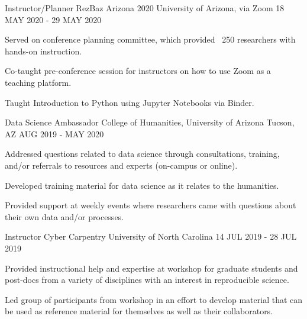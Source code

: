 \begin{cventries}
\cventry
{Instructor/Planner} %
{RezBaz Arizona 2020} %
{University of Arizona, via Zoom} %
{18 MAY 2020 - 29 MAY 2020} %
{ %
\begin{cvitems}
\item {Served on conference planning committee, which provided ~250 researchers with hands-on instruction.}
\item {Co-taught pre-conference session for instructors on how to use Zoom as a teaching platform.}
\item {Taught Introduction to Python using Jupyter Notebooks via Binder.}
\end{cvitems}
}


\cventry
{Data Science Ambassador} %
{College of Humanities, University of Arizona} %
{Tucson, AZ} %
{AUG 2019 - MAY 2020} %
{ %
\begin{cvitems}
\item {Addressed questions related to data science through consultations, training, and/or referrals to resources and experts (on-campus or online).}
\item {Developed training material for data science as it relates to the humanities.}
\item {Provided support at weekly events where researchers came with questions about their own data and/or processes.}
\end{cvitems}
}

\cventry
{Instructor} %
{Cyber Carpentry} %
{University of North Carolina} %
{14 JUL 2019 - 28 JUL 2019} %
{ %
\begin{cvitems}
\item {Provided instructional help and expertise at workshop for graduate students and post-docs from a variety of disciplines with an interest in reproducible science.}
\item {Led group of participants from workshop in an effort to develop material that can be used as reference material for themselves as well as their collaborators.}
\end{cvitems}
}


\end{cventries}
